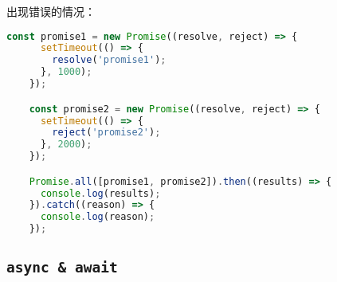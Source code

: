 \documentclass{beamer}
\begin{document}
\begin{frame}
  出现错误的情况：

  \begin{lstlisting}[language=JavaScript]
    const promise1 = new Promise((resolve, reject) => {
      setTimeout(() => {
        resolve('promise1');
      }, 1000);
    });

    const promise2 = new Promise((resolve, reject) => {
      setTimeout(() => {
        reject('promise2');
      }, 2000);
    });

    Promise.all([promise1, promise2]).then((results) => {
      console.log(results);
    }).catch((reason) => {
      console.log(reason);
    });
\end{lstlisting}

\end{frame}

\subsection{\texttt{async \& await}}
\end{document}
